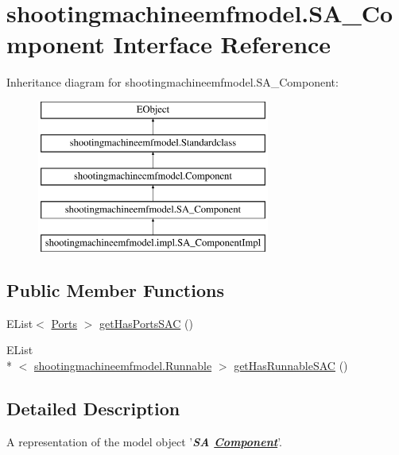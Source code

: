 \hypertarget{interfaceshootingmachineemfmodel_1_1_s_a___component}{\section{shootingmachineemfmodel.\-S\-A\-\_\-\-Component Interface Reference}
\label{interfaceshootingmachineemfmodel_1_1_s_a___component}
}
Inheritance diagram for shootingmachineemfmodel.\-S\-A\-\_\-\-Component\-:\begin{figure}[H]
\begin{center}
\leavevmode
\includegraphics[height=5.000000cm]{interfaceshootingmachineemfmodel_1_1_s_a___component}
\end{center}
\end{figure}
\subsection*{Public Member Functions}
\begin{DoxyCompactItemize}
\item 
E\-List$<$ \hyperlink{interfaceshootingmachineemfmodel_1_1_ports}{Ports} $>$ \hyperlink{interfaceshootingmachineemfmodel_1_1_s_a___component_a40d33336124d09c0ed978cc1ccf30bda}{get\-Has\-Ports\-S\-A\-C} ()
\item 
E\-List\\*
$<$ \hyperlink{interfaceshootingmachineemfmodel_1_1_runnable}{shootingmachineemfmodel.\-Runnable} $>$ \hyperlink{interfaceshootingmachineemfmodel_1_1_s_a___component_a807c969a00a6ed3837fbfe8213c3bb24}{get\-Has\-Runnable\-S\-A\-C} ()
\end{DoxyCompactItemize}


\subsection{Detailed Description}
A representation of the model object '{\itshape {\bfseries S\-A \hyperlink{interfaceshootingmachineemfmodel_1_1_component}{Component}}}'.

